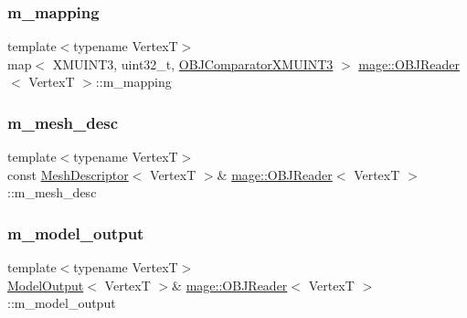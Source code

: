 \subsubsection{\texorpdfstring{m\+\_\+mapping}{m\_mapping}}
{\footnotesize\ttfamily template$<$typename VertexT$>$ \\
map$<$ X\+M\+U\+I\+N\+T3, uint32\+\_\+t, \hyperlink{structmage_1_1_o_b_j_reader_1_1_o_b_j_comparator_x_m_u_i_n_t3}{O\+B\+J\+Comparator\+X\+M\+U\+I\+N\+T3} $>$ \hyperlink{classmage_1_1_o_b_j_reader}{mage\+::\+O\+B\+J\+Reader}$<$ VertexT $>$\+::m\+\_\+mapping\hspace{0.3cm}{\ttfamily [private]}}

\hypertarget{classmage_1_1_o_b_j_reader_a3395a44a17a5749a332751465cece640}{}\label{classmage_1_1_o_b_j_reader_a3395a44a17a5749a332751465cece640} 
\subsubsection{\texorpdfstring{m\+\_\+mesh\+\_\+desc}{m\_mesh\_desc}}
{\footnotesize\ttfamily template$<$typename VertexT$>$ \\
const \hyperlink{structmage_1_1_mesh_descriptor}{Mesh\+Descriptor}$<$ VertexT $>$\& \hyperlink{classmage_1_1_o_b_j_reader}{mage\+::\+O\+B\+J\+Reader}$<$ VertexT $>$\+::m\+\_\+mesh\+\_\+desc\hspace{0.3cm}{\ttfamily [private]}}

\hypertarget{classmage_1_1_o_b_j_reader_ad4691c59a3e3ecefd201a8f03528bbd8}{}\label{classmage_1_1_o_b_j_reader_ad4691c59a3e3ecefd201a8f03528bbd8} 
\subsubsection{\texorpdfstring{m\+\_\+model\+\_\+output}{m\_model\_output}}
{\footnotesize\ttfamily template$<$typename VertexT$>$ \\
\hyperlink{structmage_1_1_model_output}{Model\+Output}$<$ VertexT $>$\& \hyperlink{classmage_1_1_o_b_j_reader}{mage\+::\+O\+B\+J\+Reader}$<$ VertexT $>$\+::m\+\_\+model\+\_\+output\hspace{0.3cm}{\ttfamily [private]}}

